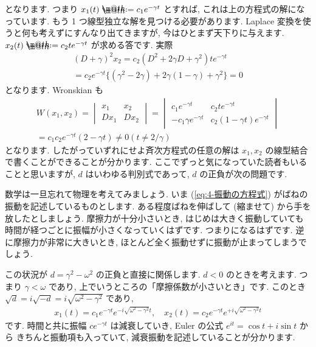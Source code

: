 \documentclass[openany, a4paper, oneside]{jsbook}
\makeatletter
\newcommand*{\defeq}{\mathrel{\rlap{%
\raisebox{0.3ex}{$\m@th\cdot$}}%
\raisebox{-0.3ex}{$\m@th\cdot$}}%
=}
\theoremstyle{break}
\theoremstyle{breakdefn}
\makeatother
\begin{document}
となります.
つまり $x_1 (t) \defeq c_1 e^{- \gamma t}$ とすれば, これは上の方程式の解になっています.
もう 1 つ線型独立な解を見つける必要があります.
Laplace 変換を使うと何も考えずにすんなり出てきますが, 今はひとまず天下りに与えます.
$x_2 (t) \defeq c_2 t e^{- \gamma t}$ が求める答です.
実際
\begin{gather}
( D + \gamma ) ^2 x_2
=
c_2 ( D^2 + 2 \gamma D + \gamma ^2 ) t e^{- \gamma t} \\
=
c_2 e^{- \gamma t }\{ ( \gamma ^2 - 2 \gamma ) +  2 \gamma ( 1 - \gamma ) + \gamma ^2   \}
=
0
\end{gather}
となります.
Wronskian も
\begin{gather}
W (x_1, x_2)
=
\begin{vmatrix}
x_1 & x_2 \\
Dx_1 & Dx_2
\end{vmatrix}
=
\begin{vmatrix}
c_1 e^{ - \gamma t} & c_2 t e^{ - \gamma t} \\
-c_1 \gamma e^{ - \gamma t} & c_2 ( 1 - \gamma t ) e^{ - \gamma t}
\end{vmatrix} \\
=
c_1 c_2 e^{ - \gamma t} ( 2 - \gamma t )
\not=
0 (t\not = 2 / \gamma )
\end{gather}
となります.
したがっていずれにせよ斉次方程式の任意の解は $x_1,x_2$ の線型結合で書くことができることが分かります.
ここでずっと気になっていた読者もいることと思いますが,  $d$ はいわゆる判別式であって,
$d$ の正負が次の問題です.

数学は一旦忘れて物理を考えてみましょう.
いま (\ref{eq:4-振動の方程式}) がばねの振動を記述しているものとします.
ある程度ばねを伸ばして (縮ませて) から手を放したとしましょう.
摩擦力が十分小さいとき, はじめは大きく振動していても時間が経つごとに振幅が小さくなっていくはずです.
つまりになるはずです.
逆に摩擦力が非常に大きいとき, ほとんど全く振動せずに振動が止まってしまうでしょう.

この状況が $d = \gamma ^2 - \omega ^2$ の正負と直接に関係します.
$d<0$ のときを考えます.
つまり $\gamma < \omega$ であり, 上でいうところの「摩擦係数が小さいとき」です.
このとき $\sqrt{d} = i \sqrt{-d} = i \sqrt{\omega ^2 - \gamma ^2}$ であり,
\begin{gather}
x_1 (t)
=
c_1 e^{- \gamma t } e^{ - i \sqrt{\omega ^2 - \gamma ^2} t}
, \quad
x_2 (t)
=
c_2 e^{- \gamma t } e^{ + i \sqrt{\omega ^2 - \gamma ^2} t }
\end{gather}
です.
時間と共に振幅 $c e^{- \gamma t}$ は減衰していき,
Euler の公式 $e^{it}= \cos t + i \sin t$ から
きちんと振動項も入っていて,
減衰振動を記述していることが分かります.
\end{document}

